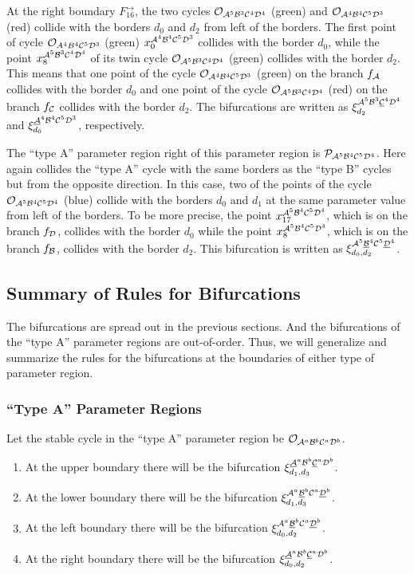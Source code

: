 At the right boundary $F_{16}^\rightarrow$, the two cycles $\mathcal{O}_{\mathcal{A}^5\mathcal{B}^3\mathcal{C}^4\mathcal{D}^4}$ (green) and $\mathcal{O}_{\mathcal{A}^4\mathcal{B}^4\mathcal{C}^5\mathcal{D}^3}$ (red) collide with the borders $d_0$ and $d_2$ from left of the borders.
The first point of cycle $\mathcal{O}_{A^4B^4\mathcal{C}^5\mathcal{D}^3}$ (green) $x_{0}^{\mathcal{A}^4\mathcal{B}^4\mathcal{C}^5\mathcal{D}^3}$ collides with the border $d_0$, while the point $x_{8}^{\mathcal{A}^5\mathcal{B}^3\mathcal{C}^4\mathcal{D}^4}$ of its twin cycle $\mathcal{O}_{\mathcal{A}^5\mathcal{B}^3\mathcal{C}^4\mathcal{D}^4}$ (green) collides with the border $d_2$.
This means that one point of the cycle $\mathcal{O}_{\mathcal{A}^4\mathcal{B}^4\mathcal{C}^5\mathcal{D}^3}$ (green) on the branch $f_{\mathcal{A}}$ collides with the border $d_0$ and one point of the cycle $\mathcal{O}_{\mathcal{A}^5\mathcal{B}^3\mathcal{C}^4\mathcal{D}^4}$ (red) on the branch $f_{\mathcal{C}}$ collides with the border $d_2$.
The bifurcations are written as $\xi_{d_2}^{\mathcal{A}^5\mathcal{B}^3\underline{\mathcal{C}}^4\mathcal{D}^4}$ and $\xi_{d_0}^{\underline{\mathcal{A}}^4\mathcal{B}^4\mathcal{C}^5\mathcal{D}^3}$, respectively.

The ``type A'' parameter region right of this parameter region is $\mathcal{P}_{\mathcal{A}^5\mathcal{B}^4\mathcal{C}^5\mathcal{D}^4}$.
Here again collides the ``type A'' cycle with the same borders as the ``type B'' cycles but from the opposite direction.
In this case, two of the points of the cycle $\mathcal{O}_{\mathcal{A}^5\mathcal{B}^4\mathcal{C}^5\mathcal{D}^4}$ (blue) collide with the borders $d_0$ and $d_1$ at the same parameter value from left of the borders.
To be more precise, the point $x_{17}^{\mathcal{A}^5\mathcal{B}^4\mathcal{C}^5\mathcal{D}^4}$, which is on the branch $f_{\mathcal{D}}$, collides with the border $d_0$ while the point $x_{8}^{\mathcal{A}^5\mathcal{B}^4\mathcal{C}^5\mathcal{D}^4}$, which is on the branch $f_{\mathcal{B}}$, collides with the border $d_2$.
This bifurcation is written as $\xi_{d_0, d_2}^{\mathcal{A}^5\underline{\mathcal{B}}^4\mathcal{C}^5\underline{\mathcal{D}}^4}$.

\subsection{Summary of Rules for Bifurcations}

The bifurcations are spread out in the previous sections.
And the bifurcations of the ``type A'' parameter regions are out-of-order.
Thus, we will generalize and summarize the rules for the bifurcations at the boundaries of either type of parameter region.

\subsubsection{``Type A'' Parameter Regions}

Let the stable cycle in the ``type A'' parameter region be $\mathcal{O}_{\mathcal{A}^a\mathcal{B}^b\mathcal{C}^a\mathcal{D}^b}$.

\begin{enumerate}
	\item At the upper boundary there will be the bifurcation $\xi_{d_1, d_3}^{\underline{\mathcal{A}}^a\mathcal{B}^b\underline{\mathcal{C}}^a\mathcal{D}^b}$.
	\item At the lower boundary there will be the bifurcation $\xi_{d_1, d_3}^{\mathcal{A}^a\underline{\mathcal{B}}^b\mathcal{C}^a\underline{\mathcal{D}}^b}$.
	\item At the left boundary there will be the bifurcation $\xi_{d_0, d_2}^{\mathcal{A}^a\underline{\mathcal{B}}^b\mathcal{C}^a\underline{\mathcal{D}}^b}$.
	\item At the right boundary there will be the bifurcation $\xi_{d_0, d_2}^{\underline{\mathcal{A}}^a\mathcal{B}^b\underline{\mathcal{C}}^a\mathcal{D}^b}$.
\end{enumerate}

